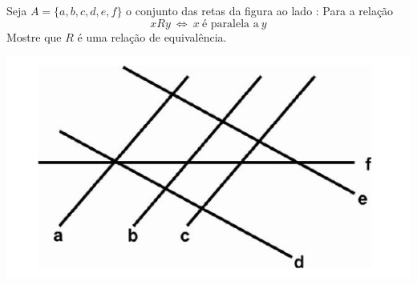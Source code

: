\begin{minipage}[bt]{0.5\linewidth}
\item Seja $A = \{a, b, c, d, e, f\}$ o conjunto das retas da figura ao lado :
Para a relação 
\[
xRy\ \Leftrightarrow\ x\  \mbox{é paralela a}\ y
\]
Mostre que $R$ é uma relação de equivalência.
\end{minipage}
\hspace{0.04\textwidth}
\begin{minipage}[h]{0.4\linewidth}
\centering
\includegraphics[scale=.5]{fig1-q49.png}
\end{minipage}
